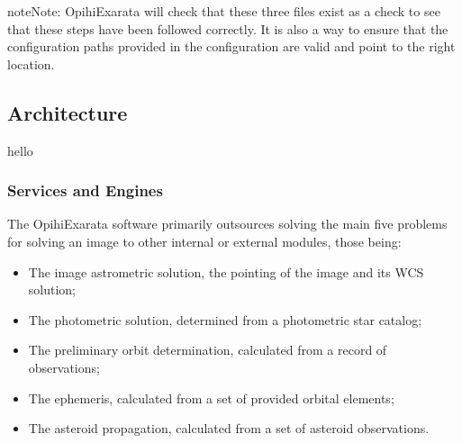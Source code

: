 \documentclass[letterpaper,11pt,english]{sphinxmanual}
\begin{document}
\begin{sphinxadmonition}{note}{Note:}
\sphinxAtStartPar
OpihiExarata will check that these three files exist as a check to see
that these steps have been followed correctly. It is also a way to ensure
that the configuration paths provided in the configuration are valid and
point to the right location.
\end{sphinxadmonition}

\sphinxstepscope


\subsection{Architecture}
\label{\detokenize{technical/architecture/index:architecture}}\label{\detokenize{technical/architecture/index:technical-architecture}}\label{\detokenize{technical/architecture/index::doc}}
\sphinxAtStartPar
hello

\sphinxstepscope


\subsubsection{Services and Engines}
\label{\detokenize{technical/architecture/services_engines:services-and-engines}}\label{\detokenize{technical/architecture/services_engines:technical-architecture-services-engines}}\label{\detokenize{technical/architecture/services_engines::doc}}
\sphinxAtStartPar
The OpihiExarata software primarily outsources solving the main five problems
for solving an image to other internal or external modules, those being:
\begin{itemize}
\item {} 
\sphinxAtStartPar
The image astrometric solution, the pointing of the image and its WCS solution;

\item {} 
\sphinxAtStartPar
The photometric solution, determined from a photometric star catalog;

\item {} 
\sphinxAtStartPar
The preliminary orbit determination, calculated from a record of observations;

\item {} 
\sphinxAtStartPar
The ephemeris, calculated from a set of provided orbital elements;

\item {} 
\sphinxAtStartPar
The asteroid propagation, calculated from a set of asteroid observations.

\end{itemize}
\end{document}

